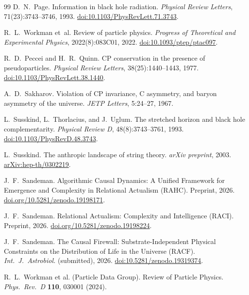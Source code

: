 \documentclass[11pt,a4paper]{article}
\begin{document}
\begin{thebibliography}{99}
D.~N.~Page.
\newblock Information in black hole radiation.
\newblock \emph{Physical Review Letters}, 71(23):3743--3746, 1993.
\newblock \href{https://doi.org/10.1103/PhysRevLett.71.3743}{doi:10.1103/PhysRevLett.71.3743}.

R.~L.~Workman et~al.
\newblock Review of particle physics.
\newblock \emph{Progress of Theoretical and Experimental Physics},
  2022(8):083C01, 2022.
\newblock \href{https://doi.org/10.1093/ptep/ptac097}{doi:10.1093/ptep/ptac097}.

R.~D.~Peccei and H.~R.~Quinn.
\newblock CP conservation in the presence of pseudoparticles.
\newblock \emph{Physical Review Letters}, 38(25):1440--1443, 1977.
\newblock \href{https://doi.org/10.1103/PhysRevLett.38.1440}{doi:10.1103/PhysRevLett.38.1440}.

A.~D.~Sakharov.
\newblock Violation of CP invariance, C asymmetry, and baryon asymmetry of the universe.
\newblock \emph{JETP Letters}, 5:24--27, 1967.

L.~Susskind, L.~Thorlacius, and J.~Uglum.
\newblock The stretched horizon and black hole complementarity.
\newblock \emph{Physical Review D}, 48(8):3743--3761, 1993.
\newblock \href{https://doi.org/10.1103/PhysRevD.48.3743}{doi:10.1103/PhysRevD.48.3743}.

L.~Susskind.
\newblock The anthropic landscape of string theory.
\newblock \emph{arXiv preprint}, 2003.
\newblock \href{https://arxiv.org/abs/hep-th/0302219}{arXiv:hep-th/0302219}.

J.~F.~Sandeman.
\newblock Algorithmic Causal Dynamics: A Unified Framework for Emergence
  and Complexity in Relational Actualism ({RAHC}).
\newblock Preprint, 2026.
\newblock \href{https://doi.org/10.5281/zenodo.19198171}{doi.org/10.5281/zenodo.19198171}.

J.~F.~Sandeman.
\newblock Relational Actualism: Complexity and Intelligence ({RACI}).
\newblock Preprint, 2026.
\newblock \href{https://doi.org/10.5281/zenodo.19198224}{doi.org/10.5281/zenodo.19198224}.


J.~F.~Sandeman.
\newblock The Causal Firewall: Substrate-Independent Physical Constraints
  on the Distribution of Life in the Universe (RACF).
\newblock \textit{Int.\ J.\ Astrobiol.} (submitted), 2026.
\newblock \href{https://doi.org/10.5281/zenodo.19319374}%
  {doi:10.5281/zenodo.19319374}.

R.~L.~Workman et al. (Particle Data Group).
\newblock Review of Particle Physics.
\newblock \textit{Phys.\ Rev.\ D} \textbf{110}, 030001 (2024).

\end{thebibliography}
\end{document}
